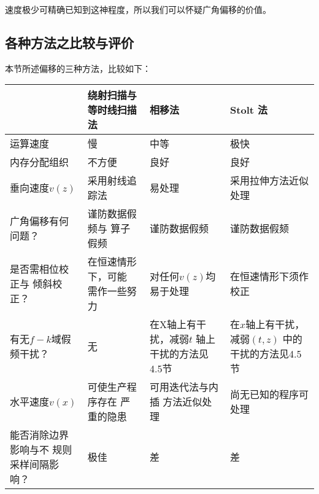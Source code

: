 速度极少可精确已知到这神程度，所以我们可以怀疑广角偏移的价值。

\subsection{各种方法之比较与评价 }
\label{sec:1.3.9}

本节所述偏移的三种方法，比较如下：
\begin{table}[!ht]
\centering
\ttfamily
\small
\begin{tabularx}{\textwidth}{Y|Y|Y|Y}
\hline
 & 绕射扫描与等时线扫描法 & 相移法 & Stolt 法\\
\hline
运算速度 &慢 & 中等 & 极快\\ \hline
内存分配组织 & 不方便 & 良好 & 良好\\ \hline
垂向速度$v(z)$ & 采用射线追踪法& 易处理 & 采用拉伸方法近似处理\\ \hline
广角偏移有何问题？ & 谨防数据假频与
					算子假频
 & 谨防数据假频 & 谨防数据假颏\\ \hline
是否需相位校正与
倾斜校正？
 & 在恒速情形下，可能
需作一些努力
 & 对任何$v(z)$均易于处理 &
在恒速情形下须作校正\\ \hline
有无$f-k$域假频干扰？ & 无 & 在X轴上有干扰，减弱$t$
轴上干扰的方法见4.5节 &
在$x$轴上有干扰，减弱$(t,z)$
中的干扰的方法见4.5节\\ \hline
水平速度$v(x)$
 & 可使生产程序存在
严重的隐患
 & 可用迭代法与内插
方法近似处理 &
尚无已知的程序可处理\\ \hline
能否消除边界影响与不
规则采样间隔影响？ & 极佳 & 差 & 差\\ \hline
\end{tabularx}
\end{table}

